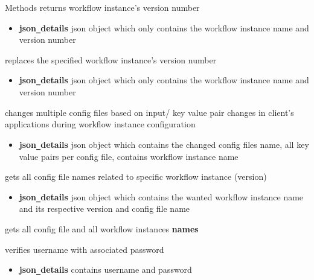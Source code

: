 \begin{methodenv}{Methods}
returns workflow instance's version number 
\begin{itemize}
        \item \textbf{json\texttt{\_}details}
        json object which only contains the workflow instance name and version number 
\end{itemize}

replaces the specified workflow instance's version number 
\begin{itemize}
        \item \textbf{json\texttt{\_}details}
        json object which only contains the workflow instance name and version number
\end{itemize}


changes multiple config files based on input/ key value pair changes in client's applications during workflow instance 
configuration
\begin{itemize}
        \item \textbf{json\texttt{\_}details}
        json object which contains the changed config files name, 
        all key value pairs per config file, 
        contains workflow instance name
\end{itemize}

gets all config file names related to specific workflow instance (version)
\begin{itemize}
        \item \textbf{json\texttt{\_}details}
        json object which contains the wanted workflow instance name and its respective version and config file name
\end{itemize}


gets all  config file and all workflow instances \textbf{names} 

verifies username with associated password
\begin{itemize}
        \item \textbf{json\texttt{\_}details}
        contains username and password
\end{itemize}


\end{methodenv}

